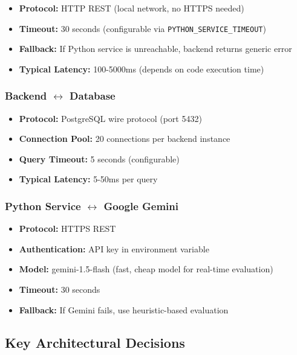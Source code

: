 \documentclass[12pt,a4paper,oneside]{article}
\newcommand{\varname}[1]{\texttt{#1}}
\begin{document}
\begin{itemize}
    \item \textbf{Protocol:} HTTP REST (local network, no HTTPS needed)
    \item \textbf{Timeout:} 30 seconds (configurable via \varname{PYTHON\_SERVICE\_TIMEOUT})
    \item \textbf{Fallback:} If Python service is unreachable, backend returns generic error
    \item \textbf{Typical Latency:} 100-5000ms (depends on code execution time)
\end{itemize}

\subsubsection{Backend $\leftrightarrow$ Database}

\begin{itemize}
    \item \textbf{Protocol:} PostgreSQL wire protocol (port 5432)
    \item \textbf{Connection Pool:} 20 connections per backend instance
    \item \textbf{Query Timeout:} 5 seconds (configurable)
    \item \textbf{Typical Latency:} 5-50ms per query
\end{itemize}

\subsubsection{Python Service $\leftrightarrow$ Google Gemini}

\begin{itemize}
    \item \textbf{Protocol:} HTTPS REST
    \item \textbf{Authentication:} API key in environment variable
    \item \textbf{Model:} gemini-1.5-flash (fast, cheap model for real-time evaluation)
    \item \textbf{Timeout:} 30 seconds
    \item \textbf{Fallback:} If Gemini fails, use heuristic-based evaluation
\end{itemize}

\subsection{Key Architectural Decisions}
\end{document}
